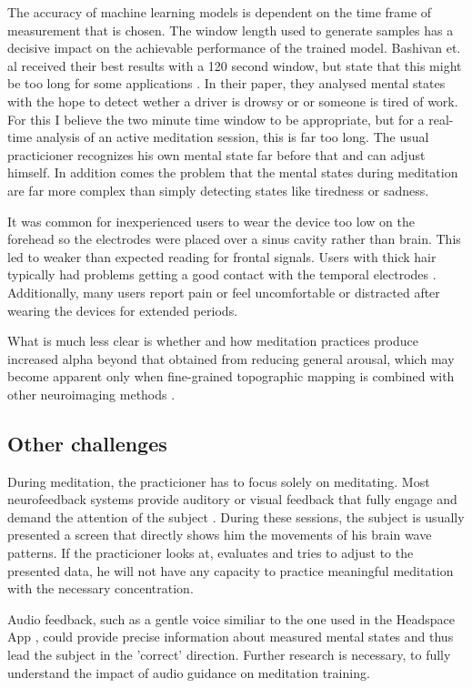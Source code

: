\documentclass{llncs} %
\begin{document}
The accuracy of machine learning models is dependent on the time frame of measurement that is chosen. The window length used to generate samples has a decisive impact on the achievable performance of the trained model. Bashivan et. al received their best results with a 120 second window, but state that this might be too long for some applications \cite{Bashivan: et al}. In their paper, they analysed mental states with the hope to detect wether a driver is drowsy or or someone is tired of work. For this I believe the two minute time window to be appropriate, but for a real-time analysis of an active meditation session, this is far too long. The usual practicioner recognizes his own mental state far before that and can adjust himself. In addition comes the problem that the mental states during meditation are far more complex than simply detecting states like tiredness or sadness.
\medskip

It was common for inexperienced users to wear the device too low on the forehead so the electrodes were placed over a sinus cavity rather than brain. This led to weaker than expected reading for frontal signals. Users with thick hair typically had problems getting a good contact with the temporal electrodes \cite{Bashivan: et al}. Additionally, many users report pain or feel uncomfortable or distracted after wearing the devices for extended periods. 
\medskip

What is much less clear is whether and how meditation practices produce increased alpha beyond that obtained from reducing general arousal, which may become apparent only when fine-grained topographic mapping is combined with other neuroimaging methods \cite{Cahn}.

\subsection{Other challenges}
During meditation, the practicioner has to focus solely on meditating. Most neurofeedback systems provide auditory or visual feedback that fully engage and demand the attention of the subject \cite{brand:del}. During these sessions, the subject is usually presented a screen that directly shows him the movements of his brain wave patterns. If the practicioner looks at, evaluates and tries to adjust to the presented data, he will not have any capacity to practice meaningful meditation with the necessary concentration. 
\medskip

Audio feedback, such as a gentle voice similiar to the one used in the Headspace App \cite{Headspace}, could provide precise information about measured mental states and thus lead the subject in the 'correct' direction. Further research is necessary, to fully understand the impact of audio guidance on meditation training.
\medskip
\end{document}

